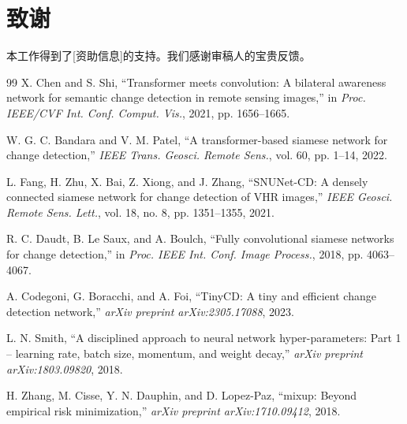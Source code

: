 \documentclass[journal]{IEEEtran}
\begin{document}
\section*{致谢}

本工作得到了[资助信息]的支持。我们感谢审稿人的宝贵反馈。

\begin{thebibliography}{99}
X. Chen and S. Shi, ``Transformer meets convolution: A bilateral awareness network for semantic change detection in remote sensing images,'' in \emph{Proc. IEEE/CVF Int. Conf. Comput. Vis.}, 2021, pp. 1656--1665.

W. G. C. Bandara and V. M. Patel, ``A transformer-based siamese network for change detection,'' \emph{IEEE Trans. Geosci. Remote Sens.}, vol. 60, pp. 1--14, 2022.

L. Fang, H. Zhu, X. Bai, Z. Xiong, and J. Zhang, ``SNUNet-CD: A densely connected siamese network for change detection of VHR images,'' \emph{IEEE Geosci. Remote Sens. Lett.}, vol. 18, no. 8, pp. 1351--1355, 2021.

R. C. Daudt, B. Le Saux, and A. Boulch, ``Fully convolutional siamese networks for change detection,'' in \emph{Proc. IEEE Int. Conf. Image Process.}, 2018, pp. 4063--4067.

A. Codegoni, G. Boracchi, and A. Foi, ``TinyCD: A tiny and efficient change detection network,'' \emph{arXiv preprint arXiv:2305.17088}, 2023.

L. N. Smith, ``A disciplined approach to neural network hyper-parameters: Part 1 -- learning rate, batch size, momentum, and weight decay,'' \emph{arXiv preprint arXiv:1803.09820}, 2018.

H. Zhang, M. Cisse, Y. N. Dauphin, and D. Lopez-Paz, ``mixup: Beyond empirical risk minimization,'' \emph{arXiv preprint arXiv:1710.09412}, 2018.

\end{thebibliography}
\end{document}
